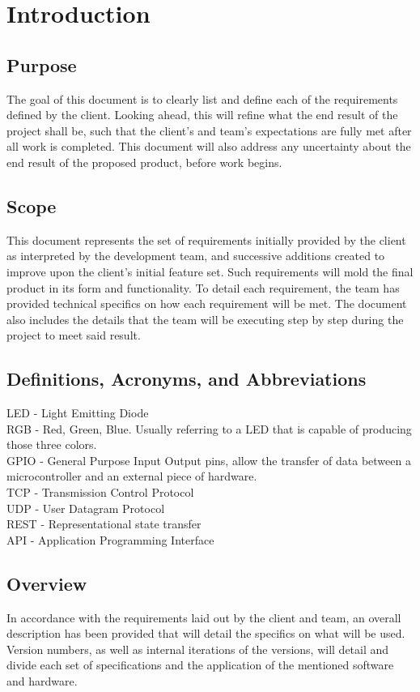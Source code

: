 	\section{Introduction}

		\subsection{Purpose}
			The goal of this document is to clearly list and define each of the requirements defined by the client.  Looking ahead, this will refine what the end result of the project shall be,
			such that the client's and team's expectations are fully met after all work is completed.  This document will also address any uncertainty about the end result of the proposed product,
			before work begins.
		\subsection{Scope}
			This document represents the set of requirements initially provided by the client as interpreted by the development team, and successive additions created to improve upon the client's initial feature set.
			Such requirements will mold the final product in its form and functionality. To detail each requirement, the team has provided technical specifics on how each requirement will be met.  The document also
			includes the details that the team will be executing step by step	during the project to meet said result.

		\subsection{Definitions, Acronyms, and Abbreviations}
			LED - Light Emitting Diode \\
			RGB - Red, Green, Blue. Usually referring to a LED that is capable of producing those three colors. \\
			GPIO - General Purpose Input Output pins, allow the transfer of data between a microcontroller and an external piece of hardware. \\
			TCP - Transmission Control Protocol \\
			UDP - User Datagram Protocol \\
			REST - Representational state transfer \\
			API - Application Programming Interface \\


		\endgroup

		\subsection{Overview}
			In accordance with the requirements laid out by the client and team, an overall description has been provided that will detail the specifics on what will be used. Version numbers, as well as internal iterations of the versions, will detail
			and divide each set of specifications and the application of the mentioned software and hardware.


